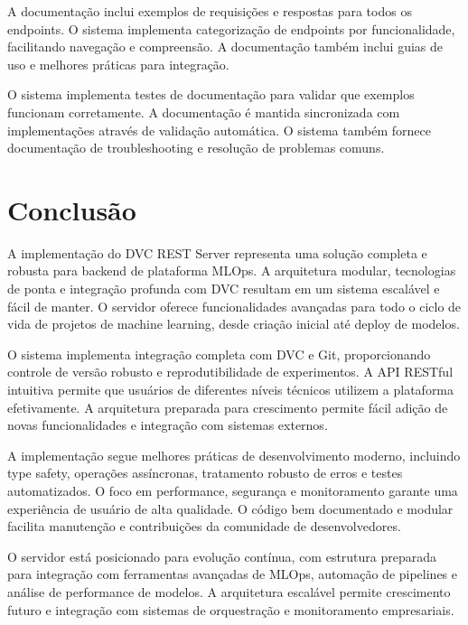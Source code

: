 \documentclass[12pt,a4paper]{article}
\begin{document}
A documentação inclui exemplos de requisições e respostas para todos os endpoints. O sistema implementa categorização de endpoints por funcionalidade, facilitando navegação e compreensão. A documentação também inclui guias de uso e melhores práticas para integração.

O sistema implementa testes de documentação para validar que exemplos funcionam corretamente. A documentação é mantida sincronizada com implementações através de validação automática. O sistema também fornece documentação de troubleshooting e resolução de problemas comuns.

\section{Conclusão}

A implementação do DVC REST Server representa uma solução completa e robusta para backend de plataforma MLOps. A arquitetura modular, tecnologias de ponta e integração profunda com DVC resultam em um sistema escalável e fácil de manter. O servidor oferece funcionalidades avançadas para todo o ciclo de vida de projetos de machine learning, desde criação inicial até deploy de modelos.

O sistema implementa integração completa com DVC e Git, proporcionando controle de versão robusto e reprodutibilidade de experimentos. A API RESTful intuitiva permite que usuários de diferentes níveis técnicos utilizem a plataforma efetivamente. A arquitetura preparada para crescimento permite fácil adição de novas funcionalidades e integração com sistemas externos.

A implementação segue melhores práticas de desenvolvimento moderno, incluindo type safety, operações assíncronas, tratamento robusto de erros e testes automatizados. O foco em performance, segurança e monitoramento garante uma experiência de usuário de alta qualidade. O código bem documentado e modular facilita manutenção e contribuições da comunidade de desenvolvedores.

O servidor está posicionado para evolução contínua, com estrutura preparada para integração com ferramentas avançadas de MLOps, automação de pipelines e análise de performance de modelos. A arquitetura escalável permite crescimento futuro e integração com sistemas de orquestração e monitoramento empresariais.
\end{document}
